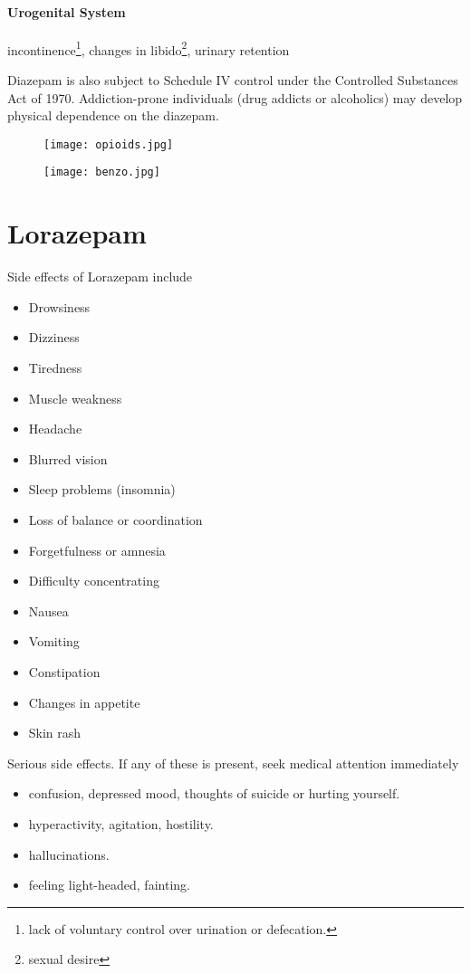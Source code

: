 \paragraph{Urogenital System}  incontinence\footnote{lack of voluntary control over urination or defecation.}, changes in libido\footnote{sexual desire}, urinary retention


Diazepam is also subject to Schedule IV control under the Controlled Substances Act of 1970. Addiction-prone individuals (drug addicts or alcoholics) may develop physical dependence on the diazepam.

\begin{figure}
\centering
\begin{minipage}{.5\textwidth}
  \centering
  \texttt{[image: opioids.jpg]}
  \label{fig:op}
\end{minipage}%
\begin{minipage}{.5\textwidth}
  \centering
  \texttt{[image: benzo.jpg]}
  \label{fig:bnz}
\end{minipage}
\end{figure}





\section{Lorazepam} 
Side effects of Lorazepam include
\begin{multicols}{2}
\begin{itemize}
\item Drowsiness
\item Dizziness
\item Tiredness
\item Muscle weakness
\item Headache
\item Blurred vision
\item Sleep problems (insomnia)
\item Loss of balance or coordination
\item Forgetfulness or amnesia
\item Difficulty concentrating
\item Nausea
\item Vomiting
\item Constipation
\item Changes in appetite
\item Skin rash
\end{itemize}
\end{multicols}
Serious side effects. If any of these is present, seek medical attention immediately
\begin{itemize}
\item confusion, depressed mood, thoughts of suicide or hurting yourself.
\item hyperactivity, agitation, hostility.
\item hallucinations.
\item feeling light-headed, fainting.
\end{itemize}